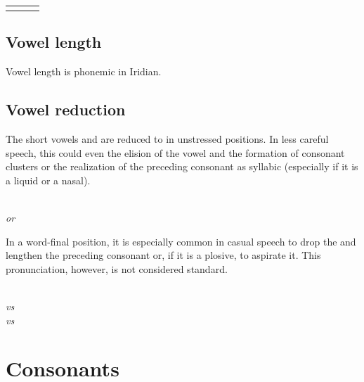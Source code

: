 \begin{table}[h!]
	\centering \small
	\begin{tabularx}{0.8\textwidth}{>{\bfseries}YYY}
				&  & \\
	\end{tabularx}
\end{table}

\subsection{Vowel length}

Vowel length is phonemic in Iridian.

\subsection{Vowel reduction}
The short vowels  and  are reduced to  in unstressed positions. In less careful speech, this could even the elision of the vowel and the formation of consonant clusters or the realization of the preceding consonant as syllabic (especially if it is a liquid or a nasal).

\ex
	\\
	 \emph{or} 
\xe

In a word-final position, it is especially common in casual speech to drop the  and lengthen the preceding consonant or, if it is a plosive, to aspirate it. This pronunciation, however, is not considered standard.

\pex
	\a
	\\
	 \emph{vs} 
	\a
	\\
	 \emph{vs} 
\xe




\section{Consonants}


